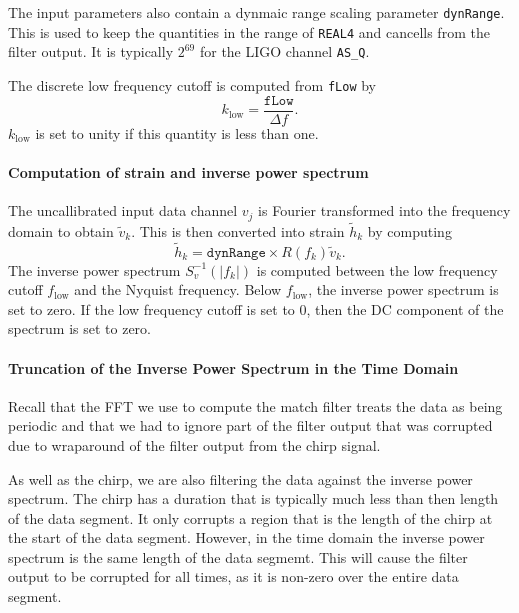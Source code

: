 The input parameters also contain a dynmaic range scaling parameter
\texttt{dynRange}. This is used to keep the quantities in the range of
\texttt{REAL4} and cancells from the filter output. It is typically $2^{69}$
for the LIGO channel \texttt{AS\_Q}.

The discrete low frequency cutoff is computed from \texttt{fLow} by
\begin{equation}
k_{\mathrm{low}} = \frac{\mathtt{fLow}}{\Delta f}.
\end{equation}
$k_{\mathrm{low}}$ is set to unity if this quantity is less than one.

\paragraph*{Computation of strain and inverse power spectrum}

The uncallibrated input data channel $v_j$ is Fourier transformed into the
frequency domain to obtain $\tilde{v}_k$. This is then converted into strain
$\tilde{h}_k$ by computing
\begin{equation}
\tilde{h}_k = \mathtt{dynRange} \times R(f_k) \tilde{v}_k.
\end{equation}
The inverse power spectrum $S^{-1}_v(|f_k|)$ is computed between the low
frequency cutoff $f_{\mathrm{low}}$ and the Nyquist frequency. Below
$f_{\mathrm{low}}$, the inverse power spectrum is set to zero. If the low
frequency cutoff is set to $0$, then the DC component of the spectrum is
set to zero.

\paragraph*{Truncation of the Inverse Power Spectrum in the Time Domain}

Recall that the FFT we use to compute the match filter treats the data as
being periodic and that we had to ignore part of the filter output that was
corrupted due to wraparound of the filter output from the chirp signal.

As well as the chirp, we are also filtering the data against the inverse power
spectrum. The chirp has a duration that is typically much less than then
length of the data segment. It only corrupts a region that is the length of
the chirp at the start of the data segment. However, in the time domain the
inverse power spectrum is the same length of the data segmemt. This will cause
the filter output to be corrupted for all times, as it is non-zero over the
entire data segment.

